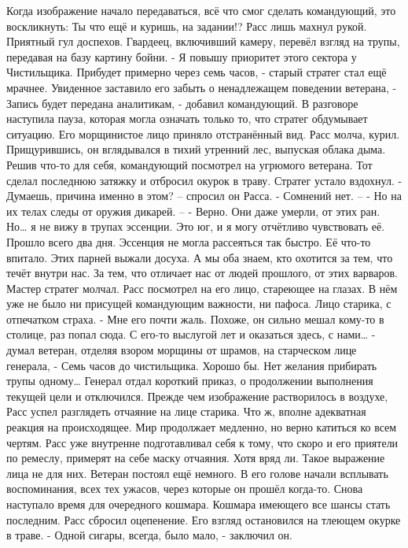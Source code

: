 \documentclass[a4paper, 12pt]{report}
\begin{document}
	Когда изображение начало передаваться, всё что смог сделать командующий, это воскликнуть: Ты что ещё и куришь, на задании!? 
	Расс лишь махнул рукой. Приятный гул доспехов. Гвардеец, включивший камеру, перевёл взгляд на трупы, передавая на базу картину бойни.
	- Я повышу приоритет этого сектора у Чистильщика. Прибудет примерно через семь часов, - старый стратег стал ещё мрачнее. Увиденное заставило его забыть о ненадлежащем поведении ветерана, - Запись будет передана аналитикам, - добавил командующий. В разговоре наступила пауза, которая могла означать только то, что стратег обдумывает ситуацию. Его морщинистое лицо приняло отстранённый вид. Расс молча, курил. Прищурившись, он вглядывался в тихий утренний лес, выпуская облака дыма. Решив что-то для себя, командующий посмотрел на угрюмого ветерана. Тот сделал последнюю затяжку и отбросил окурок в траву. Стратег устало вздохнул. 
	- Думаешь, причина именно в этом? – спросил он Расса.
	- Сомнений нет. –
	- Но на их телах следы от оружия дикарей. –
	- Верно. Они даже умерли, от этих ран. Но… я не вижу в трупах эссенции. Это юг, и я могу отчётливо чувствовать её. Прошло всего два дня. Эссенция не могла рассеяться так быстро. Её что-то впитало. Этих парней выжали досуха. А мы оба знаем, кто охотится за тем, что течёт внутри нас. За тем, что отличает нас от людей прошлого, от этих варваров.
Мастер стратег молчал. Расс посмотрел на его лицо, стареющее на глазах. В нём уже не было ни присущей командующим важности, ни пафоса. Лицо старика, с отпечатком страха.
- Мне его почти жаль. Похоже, он сильно мешал кому-то в столице, раз попал сюда. С его-то выслугой лет и оказаться здесь, с нами… - думал ветеран, отделяя взором морщины от шрамов, на старческом лице генерала, - Семь часов до чистильщика. Хорошо бы. Нет желания прибирать трупы одному…
Генерал отдал короткий приказ, о продолжении выполнения текущей цели и отключился. Прежде чем изображение растворилось в воздухе, Расс успел разглядеть отчаяние на лице старика. Что ж, вполне адекватная реакция на происходящее. Мир продолжает медленно, но верно катиться ко всем чертям. Расс уже внутренне подготавливал себя к тому, что скоро и его приятели по ремеслу, примерят на себе маску отчаяния. Хотя вряд ли. Такое выражение лица не для них.
Ветеран постоял ещё немного. В его голове начали всплывать воспоминания, всех тех ужасов, через которые он прошёл когда-то. Снова наступало время для очередного кошмара. Кошмара имеющего все шансы стать последним. 
Расс сбросил оцепенение. Его взгляд остановился на тлеющем окурке в траве.
 - Одной сигары, всегда, было мало, - заключил он.
\end{document}
